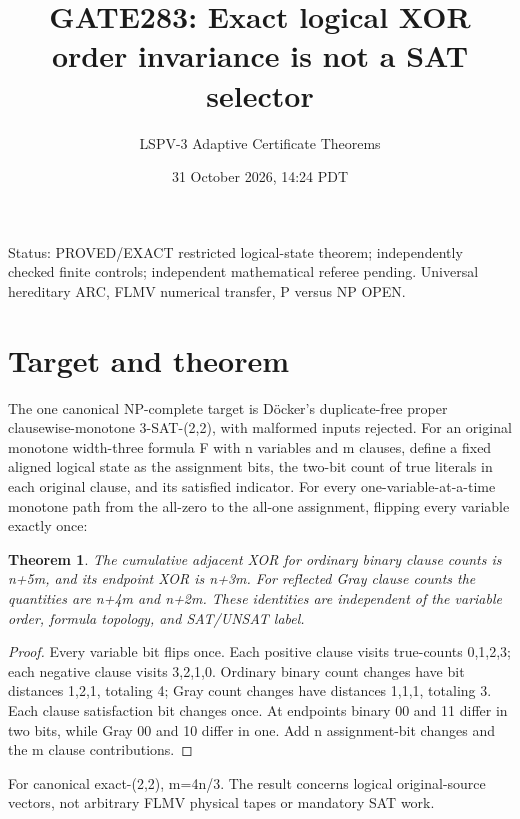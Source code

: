 \documentclass{article}
\title{GATE283: Exact logical XOR order invariance is not a SAT selector}
\author{LSPV-3 Adaptive Certificate Theorems}
\date{31 October 2026, 14:24 PDT}
\newtheorem{theorem}{Theorem}
\begin{document}
\maketitle
\noindent Status: PROVED/EXACT restricted logical-state theorem; independently checked finite controls; independent mathematical referee pending. Universal hereditary ARC, FLMV numerical transfer, P versus NP OPEN.
\section{Target and theorem}
The one canonical NP-complete target is D\"ocker's duplicate-free proper clausewise-monotone 3-SAT-(2,2), with malformed inputs rejected. For an original monotone width-three formula F with n variables and m clauses, define a fixed aligned logical state as the assignment bits, the two-bit count of true literals in each original clause, and its satisfied indicator. For every one-variable-at-a-time monotone path from the all-zero to the all-one assignment, flipping every variable exactly once:
\begin{theorem}
The cumulative adjacent XOR for ordinary binary clause counts is n+5m, and its endpoint XOR is n+3m. For reflected Gray clause counts the quantities are n+4m and n+2m. These identities are independent of the variable order, formula topology, and SAT/UNSAT label.
\end{theorem}
\begin{proof}
Every variable bit flips once. Each positive clause visits true-counts 0,1,2,3; each negative clause visits 3,2,1,0. Ordinary binary count changes have bit distances 1,2,1, totaling 4; Gray count changes have distances 1,1,1, totaling 3. Each clause satisfaction bit changes once. At endpoints binary 00 and 11 differ in two bits, while Gray 00 and 10 differ in one. Add n assignment-bit changes and the m clause contributions.
\end{proof}
For canonical exact-(2,2), m=4n/3. The result concerns logical original-source vectors, not arbitrary FLMV physical tapes or mandatory SAT work.
\end{document}
